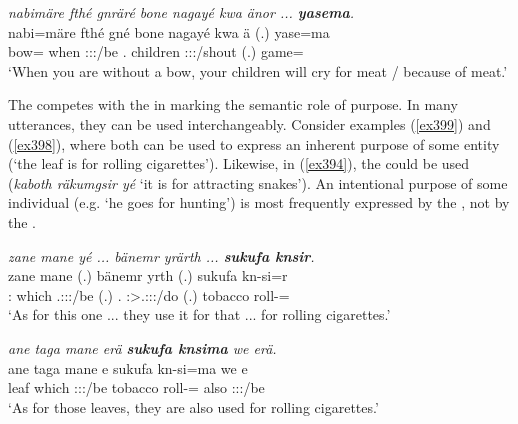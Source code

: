 \begin{exe}
	\ex \emph{nabimäre fthé gnräré bone nagayé kwa änor ... \textbf{yasema}.}\\
	\gll nabi=märe fthé gné bone nagayé kwa ä (.) yase=ma\\
	bow={\Priv} when \Ssg:\Sbj:\Imp:\Ipfv/be \Ssg.{\Poss} children {\Fut} \Stpl:\Sbj:\Nonpast:\Ipfv/shout{} (.) game={\Char}\\
	\trans `When you are without a bow, your children will cry for meat / because of meat.'\\
	\label{ex397}
\end{exe}%

The   competes with the   in marking the semantic role of purpose. In many utterances, they can be used interchangeably. Consider examples (\ref{ex399}) and (\ref{ex398}), where both can be used to express an inherent purpose of some entity (`the leaf is for rolling cigarettes'). Likewise, in (\ref{ex394}), the  could be used (\emph{kaboth räkumgsir yé} `it is for attracting snakes'). An intentional purpose of some individual (e.g. `he goes for hunting') is most frequently expressed by the  , not by the .

\begin{exe}
	\ex \emph{zane mane yé ... bänemr yrärth ... \textbf{sukufa knsir}.}\\
	\gll zane mane  (.) bänemr yrth (.) sukufa kn-si=r\\
	\Dem:{\Prox} which \Tsg.\Masc:\Sbj:\Nonpast:\Ipfv/be (.) \Recog.{\Purp} \Stpl:\Sbj>\Tsg.\Masc:\Obj:\Nonpast:\Ipfv/do (.) tobacco roll-\Nmlz={\Purp}\\
	\trans `As for this one ... they use it for that ... for rolling cigarettes.'\\
	\label{ex399}
\end{exe}
\begin{exe}
	\ex \emph{ane taga mane erä \textbf{sukufa knsima} we erä.}\\
	\gll ane taga mane e sukufa kn-si=ma we e\\
	{\Dem} leaf which \Stpl:\Sbj:\Nonpast:\Ipfv/be tobacco roll-\Nmlz={\Char} also \Stpl:\Sbj:\Nonpast:\Ipfv/be\\
	\trans `As for those leaves, they are also used for rolling cigarettes.'\\
	\label{ex398}
\end{exe}

